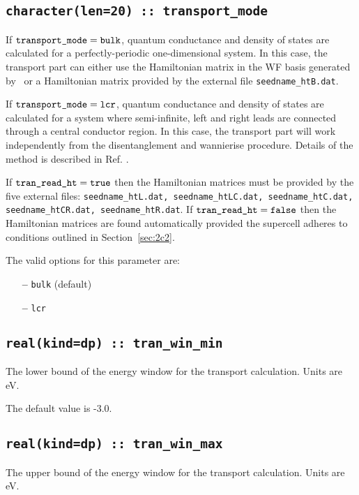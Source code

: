 \subsection[transport\_mode]{\tt character(len=20) :: transport\_mode}

If $\verb#transport_mode#=\verb#bulk#$, quantum conductance
and density of states are calculated for a perfectly-periodic one-dimensional system.
In this case, the transport part can either use
the Hamiltonian matrix in the WF basis generated by \wannier\
or a Hamiltonian matrix provided by the external file
{\tt seedname\_htB.dat}.

If $\verb#transport_mode#=\verb#lcr#$, quantum conductance and density
of states are calculated for a system where semi-infinite, left and
right leads are connected through a central conductor region.  In this
case, the transport part will work independently from the
disentanglement and wannierise procedure.  Details of the method is
described in Ref. \cite{nardelli-prb99}.

If $\verb#tran_read_ht# = \verb#true#$ then the
Hamiltonian matrices must be provided by
the five external files:
{\tt seedname\_htL.dat, seedname\_htLC.dat, seedname\_htC.dat,
seedname\_htCR.dat, seedname\_htR.dat}.
If $\verb#tran_read_ht# = \verb#false#$ then the Hamiltonian
matrices are found automatically provided the supercell adheres to
conditions outlined in Section~\ref{sec:2c2}.

The valid options for this parameter are:
\begin{itemize}
\item[{\bf --}] \verb#bulk#  (default)
\item[{\bf --}] \verb#lcr#
\end{itemize}

\subsection[tran\_win\_min]{\tt real(kind=dp) :: tran\_win\_min}
The lower bound of the energy window for the transport calculation.
Units are eV.

The default value is -3.0.

\subsection[tran\_win\_max]{\tt real(kind=dp) :: tran\_win\_max}
The upper bound of the energy window for the transport calculation.
Units are eV.

